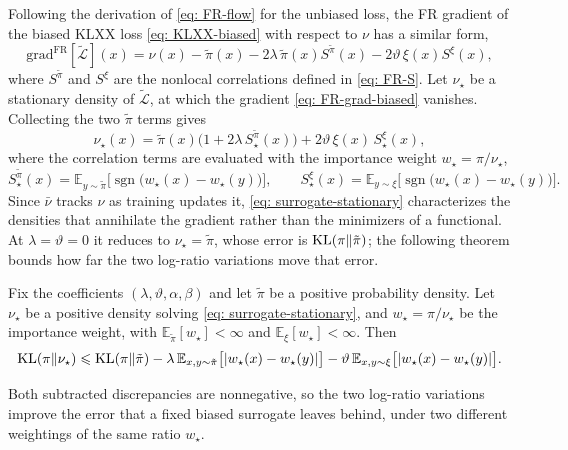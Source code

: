 \documentclass{article}
\begin{document}
Following the derivation of \eqref{eq: FR-flow} for the unbiased loss, the FR gradient of the biased KLXX loss \eqref{eq: KLXX-biased} with respect to $\nu$ has a similar form,
\begin{equation}
	\mathrm{grad}^{\mathrm{FR}}[\tilde{\mathcal L}](x) = \nu(x)-\tilde\pi(x) - 2\lambda\,\tilde\pi(x)S^{\tilde\pi}(x) - 2\vartheta\,\xi(x)S^{\xi}(x),
	\label{eq: FR-grad-biased}
\end{equation}
where $S^{\tilde\pi}$ and $S^{\xi}$ are the nonlocal correlations defined in \eqref{eq: FR-S}.
Let $\nu_\star$ be a stationary density of $\tilde {\mathcal L}$, at which the gradient \eqref{eq: FR-grad-biased} vanishes. Collecting the two $\tilde\pi$ terms gives
\begin{equation}
	\nu_\star(x) = \tilde\pi(x)\bigl(1 + 2\lambda\,S^{\tilde\pi}_\star(x)\bigr) + 2\vartheta\,\xi(x)\,S^{\xi}_\star(x),
	\label{eq: surrogate-stationary}
\end{equation}
where the correlation terms are evaluated with the importance weight $w_\star=\pi/\nu_\star$,
\begin{equation}
	S^{\tilde\pi}_\star(x) = \mathbb E_{y\sim\tilde\pi}\bigl[\operatorname{sgn}\bigl(w_\star(x)-w_\star(y)\bigr)\bigr],
	\qquad
	S^{\xi}_\star(x) = \mathbb E_{y\sim\xi}\bigl[\operatorname{sgn}\bigl(w_\star(x)-w_\star(y)\bigr)\bigr].
\end{equation}
Since $\bar\nu$ tracks $\nu$ as training updates it, \eqref{eq: surrogate-stationary} characterizes the densities that annihilate the gradient rather than the minimizers of a functional. At $\lambda=\vartheta=0$ it reduces to $\nu_\star=\tilde\pi$, whose error is $\mathrm{KL}(\pi\|\tilde\pi)$; the following theorem bounds how far the two log-ratio variations move that error.

\begin{theorem}
\label{thm: accuracy}
Fix the coefficients $(\lambda,\vartheta,\alpha,\beta)$ and let $\tilde\pi$ be a positive probability density. Let $\nu_\star$ be a positive density solving \eqref{eq: surrogate-stationary}, and $w_\star = \pi/\nu_\star$ be the importance weight, with $\mathbb E_{\tilde\pi}[w_\star]<\infty$ and $\mathbb E_{\xi}[w_\star]<\infty$. Then
\begin{equation}
	\mathrm{KL}(\pi\|\nu_\star) \leqslant \mathrm{KL}(\pi\|\tilde\pi)
	- \lambda\,\mathbb E_{x,y\sim\tilde\pi}\bigl[|w_\star(x)-w_\star(y)|\bigr]
	- \vartheta\,\mathbb E_{x,y\sim\xi}\bigl[|w_\star(x)-w_\star(y)|\bigr] .
	\label{eq: accuracy-bound}
\end{equation}
\end{theorem}
Both subtracted discrepancies are nonnegative, so the two log-ratio variations improve the error that a fixed biased surrogate leaves behind, under two different weightings of the same ratio $w_\star$.
\end{document}
